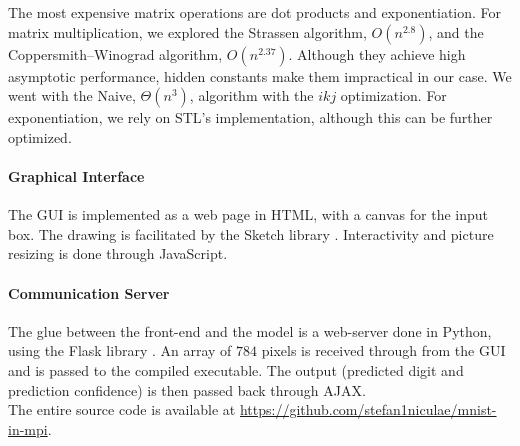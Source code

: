 \documentclass[a4paper]{article}
\begin{document}
The most expensive matrix operations are dot products and exponentiation. For matrix multiplication, we explored the Strassen algorithm, $O(n^{2.8})$, and the Coppersmith–Winograd algorithm, $O(n^{2.37})$. Although they achieve high asymptotic performance, hidden constants make them impractical in our case. We went with the Naive, $\Theta(n^3)$, algorithm with the $ikj$ optimization. For exponentiation, we rely on STL's implementation, although this can be further optimized.

\paragraph{Graphical Interface} The GUI is implemented as a web page in HTML, with a canvas for the input box.
The drawing is facilitated by the Sketch library \cite{sketch}. Interactivity and picture resizing is done through JavaScript.

\paragraph{Communication Server} The glue between the front-end and the model is a web-server done in Python, using the Flask library \cite{flask}. An array of $784$ pixels is received through from the GUI and is passed to the compiled executable. The output (predicted digit and prediction confidence) is then passed back through AJAX.
\\

\noindent The entire source code is available at \url{https://github.com/stefan1niculae/mnist-in-mpi}.

\vspace{\fill} %

    
    
\end{document}
